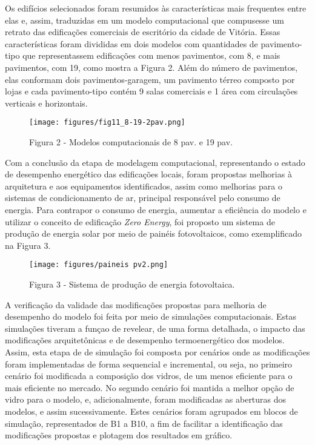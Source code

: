 \begin{onehalfspace}
    \noindent Os edifícios selecionados foram resumidos às características mais frequentes 
    entre elas e, assim, traduzidas em um modelo computacional que compusesse um retrato 
    das edificações comerciais de escritório da cidade de Vitória. Essas características 
    foram divididas em dois modelos com quantidades de pavimento-tipo que representassem 
    edificações com menos pavimentos, com 8, e mais pavimentos, com 19, como mostra a 
    Figura 2. Além do número de pavimentos, elas conformam dois pavimentos-garagem, 
    um pavimento térreo composto por lojas e cada pavimento-tipo contém 9 salas 
    comerciais e 1 área com circulações verticais e horizontais.%
    \begin{figure}[H]
        \centering
        \texttt{[image: figures/fig11\_8-19-2pav.png]}
        \begin{center}
            \scriptsize Figura 2 - Modelos computacionais de 8 pav. e 19 pav.
        \end{center}
    \end{figure}\vspace*{-0.3cm}
    \noindent Com a conclusão da etapa de modelagem computacional, representando o estado de desempenho
    energético das edificações locais, foram propostas melhorias à arquitetura e aos equipamentos
    identificados, assim como melhorias para o sistemas de condicionamento de ar, principal
    responsável pelo consumo de energia. Para contrapor o consumo de energia, aumentar a
    eficiência do modelo e utilizar o conceito de edificação \textit{Zero Energy}, foi proposto
    um sistema de produção de energia solar por meio de painéis fotovoltaicos, como exemplificado
    na Figura 3.
    \begin{figure}[H]
        \centering
        \texttt{[image: figures/paineis pv2.png]}
        \begin{center}
            \scriptsize Figura 3 - Sistema de produção de energia fotovoltaica.
        \end{center}
    \end{figure}\vspace*{-0.3cm}
    \noindent A verificação da validade das modificações propostas para melhoria de 
    desempenho do modelo foi feita por meio de simulações computacionais. Estas simulações
    tiveram a funçao de revelear, de uma forma detalhada, o impacto das modificações 
    arquitetônicas e de desempenho termoenergético dos modelos. Assim, esta etapa de 
    de simulação foi composta por cenários onde as modificações foram implementadas 
    de forma sequencial e incremental, ou seja, no primeiro cenário foi 
    modificada a composição dos vidros, de um menos eficiente para o mais eficiente 
    no mercado. No segundo cenário foi mantida a melhor opção de vidro para o modelo, e,
    adicionalmente, foram modificadas as aberturas dos modelos, e assim sucessivamente.
    Estes cenários foram agrupados em blocos de simulação, representados de B1 a B10, a fim
    de facilitar a identificação das modificações propostas e plotagem dos resultados em 
    gráfico.\vspace*{0.3cm}


\end{onehalfspace}
